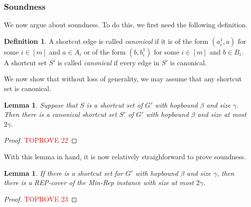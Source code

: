 \documentclass{article}
\newtheorem{lemma}[theorem]{Lemma}
\theoremstyle{definition}
\newtheorem{definition}{Definition}
\theoremstyle{remark}
\begin{document}
\subsubsection{Soundness}
We now argue about soundness.  To do this, we first need the following definition.

\begin{definition} \label{def:canonical}
    A shortcut edge is called \emph{canonical} if it is of the form $(a_i^1, a)$ for some $i \in [m]$ and $a \in A_i$ or of the form $(b, b_i^1)$ for some $i \in [m]$ and $b \in B_i$.  A shortcut set $S'$ is called \emph{canonical} if every edge in $S'$ is canonical. 
\end{definition}

We now show that without loss of generality, we may assume that any shortcut set is canonical.

\begin{lemma} \label{lem:canonical}
    Suppose that $S$ is a shortcut set of $G'$ with hopbound $\beta$ and size $\gamma$.  Then there is a canonical shortcut set $S'$ of $G'$ with hopbound $\beta$ and size at most $2 \gamma$.
\end{lemma}
\begin{proof}\textcolor{red}{TOPROVE 22}\end{proof}

With this lemma in hand, it is now relatively straighforward to prove soundness.

\begin{lemma} \label{lem:soundness}
    If there is a shortcut set for $G'$ with hopbound $\beta$ and size $\gamma$, then there is a REP-cover of the Min-Rep instance with size at most $2\gamma$.
\end{lemma}
\begin{proof}\textcolor{red}{TOPROVE 23}\end{proof} \else 
\fi









\iflong \else

\appendix

\setcounter{equation}{0}
\renewcommand{\theequation}{\thesection.\arabic{equation}}
\setcounter{theorem}{0}
\renewcommand{\thetheorem}{\thesection.\arabic{theorem}}
\setcounter{algocf}{0}
\renewcommand{\thealgocf}{\thesection.\arabic{algocf}}


\fi
\end{document}
